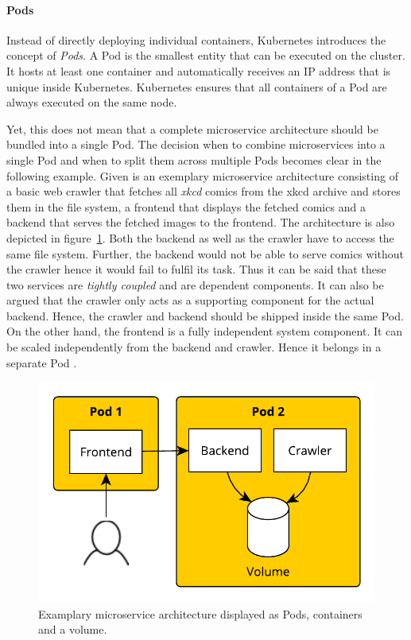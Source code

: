 \paragraph{Pods}%
\label{par:Pods}
Instead of directly deploying individual containers, Kubernetes introduces the
concept of \textit{Pods}. A Pod is the smallest entity that can be executed on
the cluster. It hosts at least one container and automatically receives an
\ac{IP} address that is unique inside Kubernetes. Kubernetes ensures that all
containers of a Pod are always executed on the same node.

Yet, this does not mean that a complete microservice architecture should be
bundled into a single Pod. The decision when to combine microservices into a
single Pod and when to split them across multiple Pods becomes clear in the
following example. Given is an exemplary microservice architecture consisting
of a basic web crawler that fetches all \textit{xkcd} comics from the xkcd
archive and stores them in the file system, a frontend that displays the
fetched comics and a backend that serves the fetched images to the frontend.
The architecture is also depicted in figure~\ref{fig:pods_example}. Both the
backend as well as the crawler have to access the same file system. Further,
the backend would not be able to serve comics without the crawler hence it
would fail to fulfil its task. Thus it can be said that these two services are
\textit{tightly coupled} and are dependent components. It can also be argued
that the crawler only acts as a supporting component for the actual backend.
Hence, the crawler and backend should be shipped inside the same Pod. On the
other hand, the frontend is a fully independent system component. It can be
scaled independently from the backend and crawler. Hence it belongs in a
separate Pod \autocite[Ch. 3]{LuksaKubernetesAction2017}. 

\begin{figure}[H]
\begin{center}
  \includegraphics[scale=0.7]{images/figures/pod_example.pdf}
\end{center}
\caption{Examplary microservice architecture displayed as Pods, containers and a volume.}%
\label{fig:pods_example}
\end{figure}

